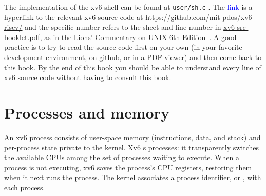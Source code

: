 The implementation of the xv6 shell can be found at
\lstinline{user/sh.c} . The \textcolor{blue}{link} is a hyperlink to
the relevant xv6 source code at
\url{https://github.com/mit-pdos/xv6-riscv/} and the specific number
refers to the sheet and line number in
\href{xv6-src-booklet.pdf}{xv6-src-booklet.pdf}, as in the Lions'
Commentary on UNIX 6th Edition~\cite{lions}. A good practice is to try
to read the source code first on your own (in your favorite
development environment, on github, or in a PDF viewer) and then come
back to this book.  By the end of this book you should be able to
understand every line of xv6 source code without having to consult this
book.


\section{Processes and memory}

An xv6 process consists of user-space memory (instructions, data, and stack)
and per-process state private to the kernel.
Xv6 
s
processes: it transparently switches the available CPUs
among the set of processes waiting to execute.
When a process is not executing, xv6 saves the process's CPU registers,
restoring them when it next runs the process.
The kernel associates a process identifier, or
,
with each process.

